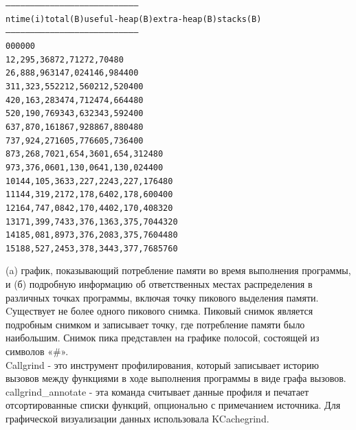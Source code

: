 \begin{alltt}
--------------------------------------------------------------------------------
  n        time(i)         total(B)   useful-heap(B) extra-heap(B)    stacks(B)
--------------------------------------------------------------------------------
  0              0                0                0             0            0
  1      2,295,368           72,712           72,704             8            0
  2      6,888,963          147,024          146,984            40            0
  3     11,323,552          212,560          212,520            40            0
  4     20,163,283          474,712          474,664            48            0
  5     20,190,769          343,632          343,592            40            0
  6     37,870,161          867,928          867,880            48            0
  7     37,924,271          605,776          605,736            40            0
  8     73,268,702        1,654,360        1,654,312            48            0
  9     73,376,060        1,130,064        1,130,024            40            0
 10    144,105,363        3,227,224        3,227,176            48            0
 11    144,319,217        2,178,640        2,178,600            40            0
 12    164,747,084        2,170,440        2,170,408            32            0
 13    171,399,743        3,376,136        3,375,704           432            0
 14    185,081,897        3,376,208        3,375,760           448            0
 15    188,527,245        3,378,344        3,377,768           576            0
\end{alltt}
(a) график, показывающий потребление памяти во время выполнения программы, и (б) подробную информацию об ответственных местах распределения в различных точках программы, включая точку пикового выделения памяти. Cуществует не более одного пикового снимка. Пиковый снимок является подробным снимком и записывает точку, где потребление памяти было наибольшим. Снимок пика представлен на графике полосой, состоящей из символов «\#».
\\
Callgrind - это инструмент профилирования, который записывает историю вызовов между функциями в ходе выполнения программы в виде графа вызовов.
\\
callgrind\_annotate - эта команда считывает данные профиля и печатает отсортированные списки функций, опционально с примечанием источника. Для графической визуализации данных использовала KCachegrind.
